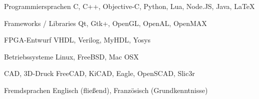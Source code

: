 
\begin{cvskills}

  \cvskill
    {Programmiersprachen} %
    {C, C++, Objective-C, Python, Lua, Node.JS, Java, LaTeX} %
    
  \cvskill
    {Frameworks / Libraries} %
    {Qt, Gtk+, OpenGL, OpenAL, OpenMAX} %

  \cvskill
    {FPGA-Entwurf} %
    {VHDL, Verilog, MyHDL, Yosys} %
    
  \cvskill
    {Betriebssysteme} %
    {Linux, FreeBSD, Mac OSX} %
    
  \cvskill
    {CAD, 3D-Druck} %
    {FreeCAD, KiCAD, Eagle, OpenSCAD, Slic3r} %

  \cvskill
    {Fremdsprachen} %
    {Englisch (fließend), Französisch (Grundkenntnisse)} %

\end{cvskills}
